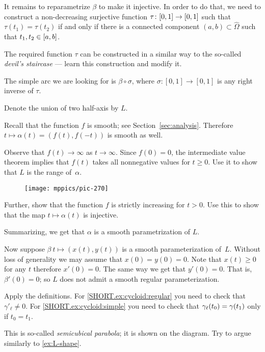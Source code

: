 It remains to reparametrize $\beta$ to make it injective.
In order to do that, we need to construct a non-decreasing surjective function $\tau\:[0,1]\z\to[0,1]$ such that 
$\tau(t_1)=\tau(t_2)$ if and only if there is a connected component $(a,b)\subset\hat \Omega$ such that $t_1,t_2\z\in [a,b]$.

The required function $\tau$ can be constructed in a similar way to the so-called \emph{devil's staircase} --- learn this construction and modify it.

The simple arc we are looking for is $\beta \circ \sigma$, where $\sigma:  [0,1]\to [0,1]$ is any right inverse of $\tau$.


Denote the union of two half-axis by $L$.

Recall that the function $f$ is smooth; see Section~\ref{sec:analysis}.
Therefore $t\mapsto \alpha(t)=(f(t),f(-t))$ is smooth as well.

Observe that $f(t)\to\infty$ as $t\to \infty$.
Since $f(0)=0$, the intermediate value theorem implies that $f(t)$ takes all nonnegative values for $t\ge 0$.
Use it to show that $L$ is the range of~$\alpha$.

\begin{wrapfigure}[12]{r}{24 mm}
\vskip0mm
\centering
\texttt{[image: mppics/pic-270]}
\vskip0mm
\end{wrapfigure}

Further, show that the function $f$ is strictly increasing for $t> 0$.
Use this to show that the map $t\mapsto \alpha(t)$ is injective.

Summarizing, we get that $\alpha$ is a smooth parametrization of $L$. 

Now suppose $\beta\:t\mapsto (x(t),y(t))$ is a smooth parameterization of~$L$.
Without loss of generality we may assume that $x(0)=y(0)=0$.
Note that $x(t)\ge 0$ for any $t$ therefore $x'(0)=0$.
The same way we get that $y'(0)=0$.
That is, $\beta'(0)=0$;
so $L$ does not admit a smooth regular parameterization.

Apply the definitions.
For \ref{SHORT.ex:cycloid:regular} you need to check that $\gamma'_\ell\ne 0$.
For \ref{SHORT.ex:cycloid:simple} you need to check that $\gamma_\ell(t_0)\z=\gamma(t_1)$ only if $t_0=t_1$.

This is so-called \emph{semicubical parabola}; it is shown on the diagram.
Try to argue similarly to \ref{ex:L-shape}.


